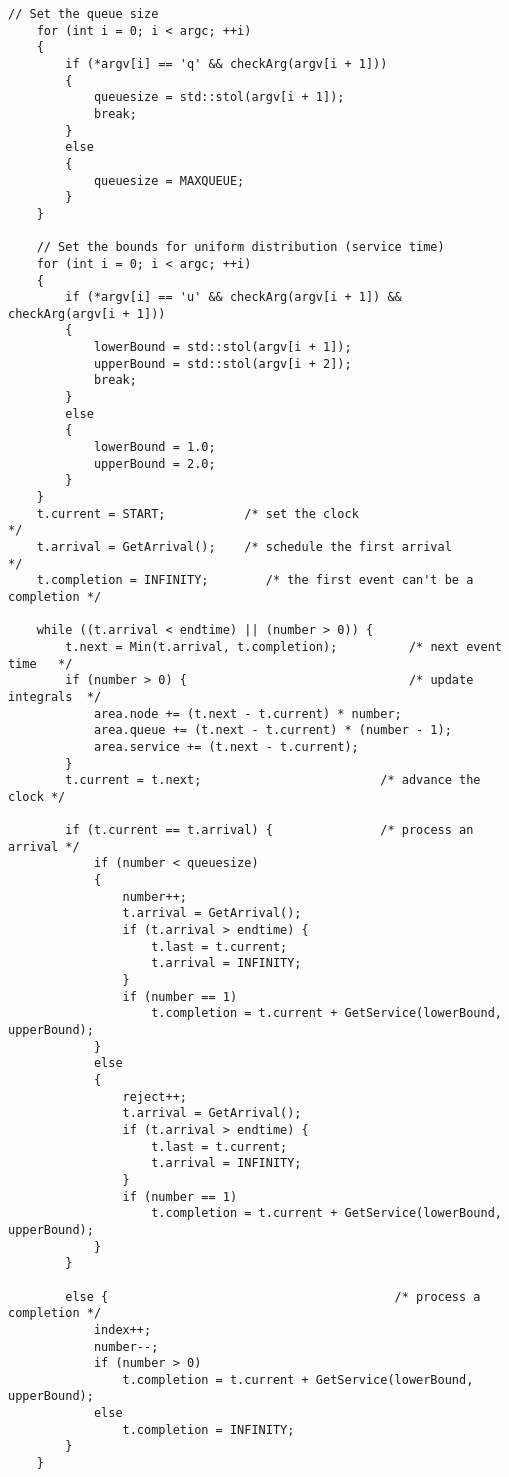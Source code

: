 \begin{lstlisting}[style=CStyle]
    // Set the queue size
    for (int i = 0; i < argc; ++i)
    {
        if (*argv[i] == 'q' && checkArg(argv[i + 1]))
        {
            queuesize = std::stol(argv[i + 1]);
            break;
        }
        else
        {
            queuesize = MAXQUEUE;
        }
    }

    // Set the bounds for uniform distribution (service time)
    for (int i = 0; i < argc; ++i)
    {
        if (*argv[i] == 'u' && checkArg(argv[i + 1]) && checkArg(argv[i + 1]))
        {
			lowerBound = std::stol(argv[i + 1]);
			upperBound = std::stol(argv[i + 2]);
            break;
        }
        else
        {
			lowerBound = 1.0;
			upperBound = 2.0;
        }
    }
    t.current = START;           /* set the clock                         */
    t.arrival = GetArrival();    /* schedule the first arrival            */
    t.completion = INFINITY;        /* the first event can't be a completion */

    while ((t.arrival < endtime) || (number > 0)) {
        t.next = Min(t.arrival, t.completion);          /* next event time   */
        if (number > 0) {                               /* update integrals  */
            area.node += (t.next - t.current) * number;
            area.queue += (t.next - t.current) * (number - 1);
            area.service += (t.next - t.current);
        }
        t.current = t.next;                         /* advance the clock */

        if (t.current == t.arrival) {               /* process an arrival */
            if (number < queuesize)
            {
                number++;
                t.arrival = GetArrival();
                if (t.arrival > endtime) {
                    t.last = t.current;
                    t.arrival = INFINITY;
                }
                if (number == 1)
                    t.completion = t.current + GetService(lowerBound, upperBound);
            }
            else
            {
				reject++;
                t.arrival = GetArrival();
                if (t.arrival > endtime) {
                    t.last = t.current;
                    t.arrival = INFINITY;
                }
                if (number == 1)
                    t.completion = t.current + GetService(lowerBound, upperBound);
            }
        }

        else {                                        /* process a completion */
            index++;
            number--;
            if (number > 0)
                t.completion = t.current + GetService(lowerBound, upperBound);
            else
                t.completion = INFINITY;
        }
    }


\end{lstlisting}

